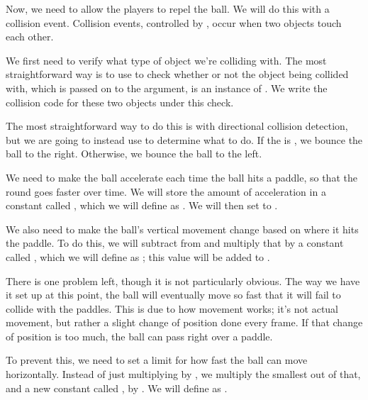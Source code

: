 \documentclass[letterpaper,10pt,english]{sphinxmanual}
\begin{document}
Now, we need to allow the players to repel the ball.  We will do this
with a collision event.  Collision events, controlled by
{\hyperref[dsp:sge.dsp.Object.event_collision]{\emph{}}}, occur when two objects touch
each other.

We first need to verify what type of object we're colliding with.  The
most straightforward way is to use  to check whether
or not the object being collided with, which is passed on to the
 argument, is an instance of .  We write the
collision code for these two objects under this check.

The most straightforward way to do this is with directional collision
detection, but we are going to instead use 
to determine what to do.  If the  is ,
we bounce the ball to the right.  Otherwise, we bounce the ball to the
left.

We need to make the ball accelerate each time the ball hits a paddle, so
that the round goes faster over time.  We will store the amount of
acceleration in a constant called , which we
will define as .  We will then set  to
.

We also need to make the ball's vertical movement change based on where
it hits the paddle.  To do this, we will subtract  from
 and multiply that by a constant called
, which we will define as ; this
value will be added to .

There is one problem left, though it is not particularly obvious.  The
way we have it set up at this point, the ball will eventually move so
fast that it will fail to collide with the paddles.  This is due to how
movement works; it's not actual movement, but rather a slight change of
position done every frame.  If that change of position is too much, the
ball can pass right over a paddle.

To prevent this, we need to set a limit for how fast the ball can move
horizontally.  Instead of just multiplying
 by
, we multiply the smallest out of that, and a
new constant called , by
.  We will define  as
.
\end{document}
